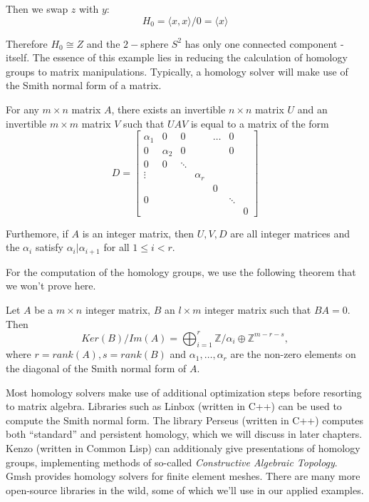 Then we swap $z$ with $y$:
\begin{equation*}
  H_{0} = \langle x,x \rangle / 0 = \langle x \rangle
\end{equation*}

Therefore $H_{0} \cong Z$ and the $2-$sphere $S^{2}$ has only one connected component - itself. The essence of this example lies in reducing the calculation of homology groups to matrix manipulations. Typically, a homology solver will make use of the Smith normal form of a matrix.

\begin{definition}
  For any $m \times n$ matrix $A$, there exists an invertible $n \times n$ matrix $U$ and an invertible $m \times m$ matrix $V$ such that $UAV$ is equal to a matrix of the form
  \begin{equation*}
    D =
    \begin{bmatrix}
      \alpha_1 & 0 & 0 & & \dots & 0\\
      0 & \alpha_2 & 0 & & & 0\\
      0 & 0 & \ddots \\
      \vdots & & & \alpha_r \\
      & & & & 0\\
      0 & & & & & \ddots \\
      & & & & & & 0
    \end{bmatrix}
  \end{equation*}

  Furthemore, if $A$ is an integer matrix, then $U,V,D$ are all integer matrices and the $\alpha_{i}$ satisfy $\alpha_{i} | \alpha_{i+1}$ for all $1 \leq i < r$.
\end{definition}

For the computation of the homology groups, we use the following theorem that we won't prove here.

\begin{theorem}
  Let $A$ be a $m \times n$ integer matrix, $B$ an $l \times m$ integer matrix such that $BA = 0$. Then
  \begin{equation*}
    Ker(B)/Im(A) = \bigoplus_{i=1}^r \mathbb{Z}/\alpha_i \oplus \mathbb{Z}^{m-r-s},
  \end{equation*}
  where $r = rank(A), s = rank(B)$ and $\alpha_{1}, \ldots, \alpha_{r}$ are the non-zero elements on the diagonal of the Smith normal form of $A$.
\end{theorem}

Most homology solvers make use of additional optimization steps before resorting to matrix algebra. Libraries such as Linbox \cite{linbox} (written in C++) can be used to compute the Smith normal form. The library Perseus \cite{perseus} (written in C++) computes both ``standard'' and persistent homology, which we will discuss in later chapters. Kenzo \cite{kenzo} (written in Common Lisp) can additionaly give presentations of homology groups, implementing methods of so-called \textit{Constructive Algebraic Topology}. Gmsh \cite{gmsh} provides homology solvers for finite element meshes. There are many more open-source libraries in the wild, some of which we'll use in our applied examples.

